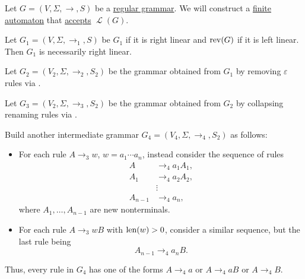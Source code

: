 \begin{algorithm}\label{alg:finite_automaton_from_regular_grammar}
  Let \( G = (V, \Sigma, \to, S) \) be a \hyperref[def:chomsky_hierarchy/regular]{regular grammar}. We will construct a \hyperref[def:finite_automaton]{finite automaton} that \hyperref[def:finite_automaton/language]{accepts} \( \mscrL(G) \).

  \begin{thmenum}
     Let \( G_1 = (V, \Sigma, \to_1, S) \) be \( G_1 \) if it is right linear and \( \operatorname{rev}(G) \) if it is left linear. Then \( G_1 \) is necessarily right linear.

     Let \( G_2 = (V_2, \Sigma, \to_2, S_2) \) be the grammar obtained from \( G_1 \) by removing \( \varepsilon \) rules via .

     Let \( G_3 = (V_2, \Sigma, \to_3, S_2) \) be the grammar obtained from \( G_2 \) by collapsing renaming rules via .

     Build another intermediate grammar \( G_4 = (V_4, \Sigma, \to_4, S_2) \) as follows:
    \begin{itemize}
      \item For each rule \( A \to_3 w \), \( w = a_1 \cdots a_n \), instead consider the sequence of rules
      \begin{align*}
        A       &\to_4 a_1 A_1, \\
        A_1     &\to_4 a_2 A_2, \\
                &\vdots \\
        A_{n-1} &\to_4 a_n,
      \end{align*}
      where \( A_1, \ldots, A_{n-1} \) are new nonterminals.

      \item For each rule \( A \to_3 wB \) with \( \operatorname{len}(w) > 0 \), consider a similar sequence, but the last rule being
      \begin{equation*}
        A_{n-1} \to_4 a_n B.
      \end{equation*}
    \end{itemize}

    Thus, every rule in \( G_4 \) has one of the forms \( A \to_4 a \) or \( A \to_4 a B \) or \( A \to_4 B \).


\end{thmenum}
\end{algorithm}
